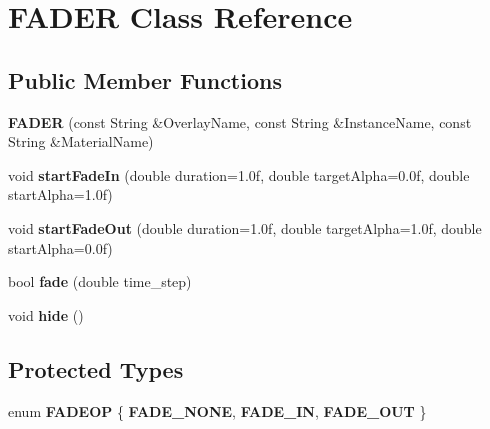 \hypertarget{class_f_a_d_e_r}{
\section{FADER Class Reference}
\label{class_f_a_d_e_r}
}
\subsection*{Public Member Functions}
\begin{DoxyCompactItemize}
\item 
\hypertarget{class_f_a_d_e_r_ae55a52ab9a75bd8789aeeab9c0e10012}{
{\bfseries FADER} (const String \&OverlayName, const String \&InstanceName, const String \&MaterialName)}
\label{class_f_a_d_e_r_ae55a52ab9a75bd8789aeeab9c0e10012}

\item 
\hypertarget{class_f_a_d_e_r_a691493952b787097453f534ce77ad6a3}{
void {\bfseries startFadeIn} (double duration=1.0f, double targetAlpha=0.0f, double startAlpha=1.0f)}
\label{class_f_a_d_e_r_a691493952b787097453f534ce77ad6a3}

\item 
\hypertarget{class_f_a_d_e_r_ab46bc35027b378414e6e912af2f17690}{
void {\bfseries startFadeOut} (double duration=1.0f, double targetAlpha=1.0f, double startAlpha=0.0f)}
\label{class_f_a_d_e_r_ab46bc35027b378414e6e912af2f17690}

\item 
\hypertarget{class_f_a_d_e_r_a04944a6d2bec7ce6022d37f99383e50e}{
bool {\bfseries fade} (double time\_\-step)}
\label{class_f_a_d_e_r_a04944a6d2bec7ce6022d37f99383e50e}

\item 
\hypertarget{class_f_a_d_e_r_ace8a731f95544937a9005c7dae350aca}{
void {\bfseries hide} ()}
\label{class_f_a_d_e_r_ace8a731f95544937a9005c7dae350aca}

\end{DoxyCompactItemize}
\subsection*{Protected Types}
\begin{DoxyCompactItemize}
\item 
enum {\bfseries FADEOP} \{ {\bfseries FADE\_\-NONE}, 
{\bfseries FADE\_\-IN}, 
{\bfseries FADE\_\-OUT}
 \}
\end{DoxyCompactItemize}

